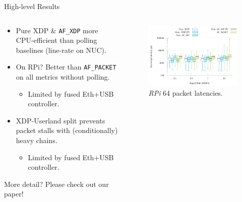 \documentclass[aspectratio=169,xcolor={dvipsnames}
]{beamer}
\newcommand{\afxdp}{\texttt{AF\_XDP}}
\newcommand{\afp}{\texttt{AF\_PACKET}}
\begin{document}
\begin{frame}{High-level Results}
	\begin{columns}
		\begin{column}{0.5\linewidth}
			\begin{itemize}
				\item Pure XDP \& \afxdp{} more CPU-efficient than polling baselines (line-rate on NUC).
				\item On RPi? Better than \afp{} on all metrics \alert{without polling}.
				\begin{itemize}
					\item Limited by fused Eth+USB controller.
				\end{itemize}
				\item XDP-Userland split prevents packet stalls with (conditionally) heavy chains.
				\begin{itemize}
					\item Limited by fused Eth+USB controller.
				\end{itemize}
			\end{itemize}
		More detail? \alert{Please check out our paper!}
		\end{column}
		\begin{column}{0.5\linewidth}
			\begin{figure}
				\centering
				\includegraphics[keepaspectratio,width=0.9\linewidth]{../plots/build/latency-vs-baselines/rpi-64B-trimlog-new}
				\caption{\emph{RPi} \qty{64}{\byte} packet latencies.\label{fig:lat-rpi}}
			\end{figure}
		\end{column}
	\end{columns}

\end{frame}
\end{document}
